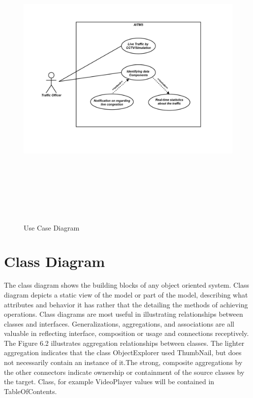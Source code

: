 \documentclass[openany,12pt]{report}
\begin{document}
\begin{figure}[H]
\centering
\includegraphics[height=6in]{./Diagrams/PNG/uml}
\caption{Use Case Diagram}
\end{figure}

\newpage
\section{Class Diagram}
\hspace*{0.5in}The class diagram shows the building blocks of any object oriented system. Class diagram depicts a static view of the model or part of the model, describing what attributes and behavior it has rather that the detailing the methods of achieving operations. Class diagrams are most useful in illustrating relationships between classes and interfaces. Generalizations, aggregations, and associations are all valuable in reflecting interface, composition or usage and connections receptively.\\
\hspace*{0.5in}The Figure 6.2 illustrates aggregation relationships between classes. The lighter aggregation indicates that the class ObjectExplorer used ThumbNail, but does not necessarily contain an instance of it.The strong, composite aggregations by the other connectors indicate ownership or containment of the source classes by the target. Class, for example VideoPlayer  values will be contained in TableOfContents.
\end{document}

